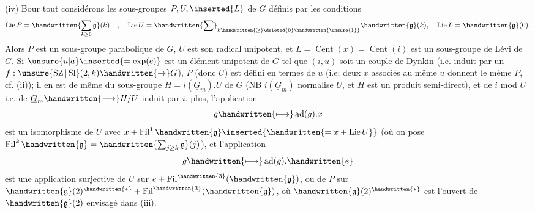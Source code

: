 (iv) Bour tout  considérons les sous-groupes $P,U,\inserted{L}$ de $G$ définis par les conditions
\[
\operatorname{Lie}P=\handwritten{\sum_{k\geq0}\mathfrak{g}}(k)\quad,\quad
\operatorname{Lie}U=\handwritten{\sum}_{k\handwritten{\geq}\deleted{0}\handwritten{\unsure{1}}}\handwritten{\mathfrak{g}}(k),\quad
\operatorname{Lie}L=\handwritten{\mathfrak{g}}(0).
\]
Alors $P$ est un sous-groupe parabolique de $G$, $U$ est son radical unipotent, et $L=\operatorname{Cent}(x)=\operatorname{Cent}(i)$  est un sous-groupe de Lévi de $G$. Si $\unsure{u|a}\inserted{=\exp(e)}$ est un élément unipotent de $G$ tel que $(i,u)$ soit un couple de Dynkin (i.e. induit par un $f:\unsure{\operatorname{SZ}|\operatorname{Sl}}(2,k)\handwritten{\to}G$), $P$ (donc  $U$) est défini en termes de $u$ (i.e; deux $x$ associés au même $u$ donnent le même $P$, cf. (ii)); il en est de même du sous-groupe $H=i(\underline{G}_m).U$ de $G$ (NB $i(\underline{G}_m)$ normalise $U$, et $H$ est un produit semi-direct), et de $i$ mod $U$ i.e. de $\underline{G}_m\handwritten{\longrightarrow}H/U$ induit par $i$.  plus, l'application
\[
g\handwritten{\longmapsto}\operatorname{ad}(g).x
\]
est un isomorphisme de $U$ avec $x+\operatorname{Fil}^{1}\handwritten{\mathfrak{g}}\inserted{\handwritten{=x+\operatorname{Lie}U}}$ (où on pose $\operatorname{Fil}^{k}\handwritten{\mathfrak{g}}=\handwritten{\sum_{j\geq k}\mathfrak{g}}(j)$), et l'application
\[
g\handwritten{\longmapsto}\operatorname{ad}(g).\handwritten{e}
\]
est une application surjective de $U$ sur $e+\operatorname{Fil}^{\handwritten{3}}(\handwritten{\mathfrak{g}})$, ou de $P$ sur $\handwritten{\mathfrak{g}}(2)^{\handwritten{*}}+\operatorname{Fil}^{\handwritten{3}}(\handwritten{\mathfrak{g}})$, où $\handwritten{\mathfrak{g}}(2)^{\handwritten{*}}$ est l'ouvert de $\handwritten{\mathfrak{g}}(2)$ envisagé dans (iii).

